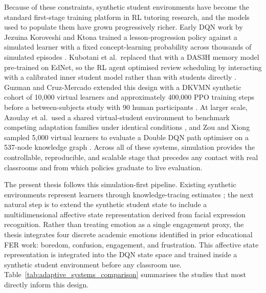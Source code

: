 Because of these constraints, synthetic student environments have become the standard first-stage training platform in \ac{RL} tutoring research, and the models used to populate them have grown progressively richer. Early \ac{DQN} work by Jezuina Koroveshi and Ktona trained a lesson-progression policy against a simulated learner with a fixed concept-learning probability across thousands of simulated episodes \cite{jezuina_koroveshi_training_2021}. Kubotani et al.\ replaced that with a DAS3H memory model pre-trained on EdNet, so the \ac{RL} agent optimised review scheduling by interacting with a calibrated inner student model rather than with students directly \cite{kubotani_rltutor_2021}. Guzman and Cruz-Mercado extended this design with a DKVMN synthetic cohort of 10{,}000 virtual learners and approximately 400{,}000 \ac{PPO} training steps before a between-subjects study with 90 human participants \cite{guzman_developing_2025}. At larger scale, Azoulay et al.\ used a shared virtual-student environment to benchmark competing adaptation families under identical conditions \cite{azoulay_adaptive_2021}, and Zou and Xiong sampled 5{,}000 virtual learners to evaluate a Double \ac{DQN} path optimiser on a 537-node knowledge graph \cite{zou_deep_2026}. Across all of these systems, simulation provides the controllable, reproducible, and scalable stage that precedes any contact with real classrooms and from which policies graduate to live evaluation.

The present thesis follows this simulation-first pipeline. Existing synthetic environments represent learners through knowledge-tracing estimates \cite{azoulay_adaptive_2021,fu_integrating_2025,kubotani_rltutor_2021,jezuina_koroveshi_training_2021}; the next natural step is to extend the synthetic student state to include a multidimensional affective state representation derived from facial expression recognition. Rather than treating emotion as a single engagement proxy, the thesis integrates four discrete academic emotions identified in prior educational \ac{FER} work: boredom, confusion, engagement, and frustration. This affective state representation is integrated into the \ac{DQN} state space and trained inside a synthetic student environment before any classroom use. Table~\ref{tab:adaptive_systems_comparison} summarises the studies that most directly inform this design.

